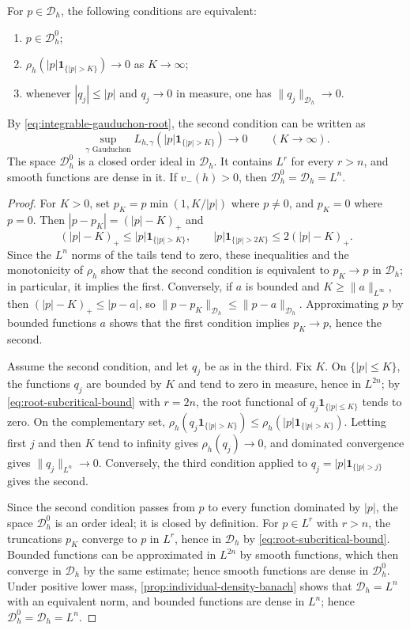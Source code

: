 \begin{proposition}\label{prop:root-uniform-tails}
For $p\in\mathcal D_h$, the following conditions are equivalent:
\begin{enumerate}
\item $p\in\mathcal D_h^0$;
\item $\rho_h(|p|\mathbf1_{\{|p|>K\}})\to0$ as $K\to\infty$;
\item whenever $|q_j|\leq|p|$ and $q_j\to0$ in measure, one has $\|q_j\|_{\mathcal D_h}\to0$.
\end{enumerate}
By \eqref{eq:integrable-gauduchon-root}, the second condition can be written as
\[
 \sup_{\gamma\text{ Gauduchon}}
       L_{h,\gamma}(|p|\mathbf1_{\{|p|>K\}})\longrightarrow0
 \qquad(K\to\infty).
\]
The space $\mathcal D_h^0$ is a closed order ideal in $\mathcal D_h$. It contains $L^r$ for every $r>n$, and smooth functions are dense in it. If $v_-(h)>0$, then $\mathcal D_h^0=\mathcal D_h=L^n$.
\end{proposition}
\begin{proof}
For $K>0$, set $p_K=p\min(1,K/|p|)$ where $p\ne0$, and $p_K=0$ where $p=0$. Then $|p-p_K|=(|p|-K)_+$ and
\[
 (|p|-K)_+\leq |p|\mathbf1_{\{|p|>K\}},\qquad
 |p|\mathbf1_{\{|p|>2K\}}\leq2(|p|-K)_+.
\]
Since the $L^n$ norms of the tails tend to zero, these inequalities and the monotonicity of $\rho_h$ show that the second condition is equivalent to $p_K\to p$ in $\mathcal D_h$; in particular, it implies the first. Conversely, if $a$ is bounded and $K\geq\|a\|_{L^\infty}$, then $(|p|-K)_+\leq|p-a|$, so $\|p-p_K\|_{\mathcal D_h}\leq\|p-a\|_{\mathcal D_h}$. Approximating $p$ by bounded functions $a$ shows that the first condition implies $p_K\to p$, hence the second.

Assume the second condition, and let $q_j$ be as in the third. Fix $K$. On $\{|p|\leq K\}$, the functions $q_j$ are bounded by $K$ and tend to zero in measure, hence in $L^{2n}$; by \eqref{eq:root-subcritical-bound} with $r=2n$, the root functional of $q_j\mathbf1_{\{|p|\leq K\}}$ tends to zero. On the complementary set, $\rho_h(q_j\mathbf1_{\{|p|>K\}})\leq\rho_h(|p|\mathbf1_{\{|p|>K\}})$. Letting first $j$ and then $K$ tend to infinity gives $\rho_h(q_j)\to0$, and dominated convergence gives $\|q_j\|_{L^n}\to0$. Conversely, the third condition applied to $q_j=|p|\mathbf1_{\{|p|>j\}}$ gives the second.

Since the second condition passes from $p$ to every function dominated by $|p|$, the space $\mathcal D_h^0$ is an order ideal; it is closed by definition. For $p\in L^r$ with $r>n$, the truncations $p_K$ converge to $p$ in $L^r$, hence in $\mathcal D_h$ by \eqref{eq:root-subcritical-bound}. Bounded functions can be approximated in $L^{2n}$ by smooth functions, which then converge in $\mathcal D_h$ by the same estimate; hence smooth functions are dense in $\mathcal D_h^0$. Under positive lower mass, \cref{prop:individual-density-banach} shows that $\mathcal D_h=L^n$ with an equivalent norm, and bounded functions are dense in $L^n$; hence $\mathcal D_h^0=\mathcal D_h=L^n$.
\end{proof}

